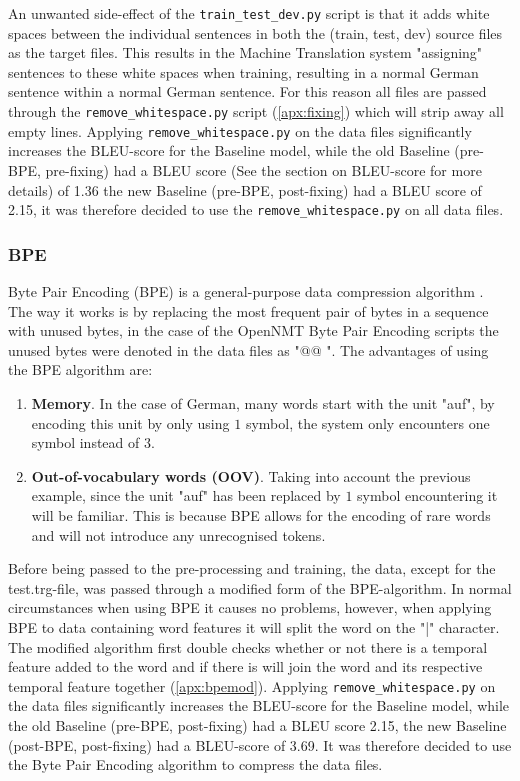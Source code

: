 An unwanted side-effect of the \texttt{train\_test\_dev.py} \cite{dimitarshterionovtrain} script is that it adds white spaces between the individual sentences in both the (train, test, dev) source files as the target files. This results in the Machine Translation system "assigning" sentences to these white spaces when training, resulting in a normal German sentence within a normal German sentence. For this reason all files are passed through the \texttt{remove\_whitespace.py} script (\autoref{apx:fixing}) which will strip away all empty lines. Applying \texttt{remove\_whitespace.py} on the data files significantly increases the BLEU-score for the Baseline model, while the old Baseline (pre-BPE, pre-fixing) had a BLEU score (See the section on BLEU-score for more details) of 1.36 the new Baseline (pre-BPE, post-fixing) had a BLEU score of 2.15, it was therefore decided to use the \texttt{remove\_whitespace.py} on all data files.


\subsubsection{BPE}

Byte Pair Encoding (BPE) is a general-purpose data compression algorithm \cite{sennrich2015neural} \cite{gage1994new}. The way it works is by replacing the most frequent pair of bytes in a sequence with unused bytes, in the case of the OpenNMT Byte Pair Encoding \cite{klein-etal-2017-opennmt} scripts the unused bytes were denoted in the data files as "@@ ". The advantages of using the BPE algorithm are:

\begin{enumerate}
    \item \textbf{Memory}. In the case of German, many words start with the unit "auf", by encoding this unit by only using $1$ symbol, the system only encounters one symbol instead of $3$. \cite{gage1994new}
    \item \textbf{Out-of-vocabulary words (OOV)}. Taking into account the previous example, since the unit "auf" has been replaced by $1$ symbol encountering it will be familiar. This is because BPE allows for the encoding of rare words and will not introduce any unrecognised tokens. \cite{gage1994new} \cite{sennrich2015neural}
\end{enumerate}

Before being passed to the pre-processing and training, the data, except for the test.trg-file, was passed through a modified form of the BPE-algorithm. In normal circumstances when using BPE it causes no problems, however, when applying BPE to data containing word features it will split the word on the "|" character. The modified algorithm first double checks whether or not there is a temporal feature added to the word and if there is will join the word and its respective temporal feature together (\autoref{apx:bpemod}). Applying \texttt{remove\_whitespace.py} on the data files significantly increases the BLEU-score for the Baseline model, while the old Baseline (pre-BPE, post-fixing) had a BLEU score 2.15, the new Baseline (post-BPE, post-fixing) had a BLEU-score of 3.69. It was therefore decided to use the Byte Pair Encoding algorithm to compress the data files.


